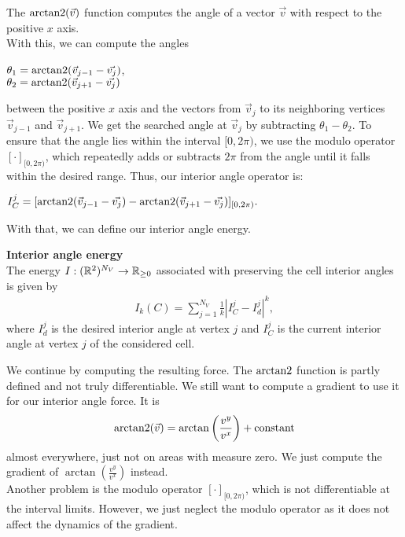 The $\operatorname{arctan2}(\vec{v})$ function computes the angle of a vector $\vec{v}$ with respect to the positive $x$ axis. \\
With this, we can compute the angles 
\begin{center}
	
	$\theta_1 = \operatorname{arctan2}( \vec{v}_{j-1} - \vec{v_j} )$, \\
	$\theta_2 = \operatorname{arctan2}( \vec{v}_{j+1} - \vec{v_j} )$
	
\end{center}
between the positive $x$ axis and the vectors from $\vec{v}_j$ to its neighboring vertices $\vec{v}_{j-1}$ and $\vec{v}_{j+1}$. 
We get the searched angle at $\vec{v}_j$ by subtracting $\theta_1 - \theta_2$.
To ensure that the angle lies within the interval $[0, 2\pi)$, we use the modulo operator $[ \cdot ]_{[0,2\pi)}$, which repeatedly adds or subtracts $2\pi$ from the angle until it falls within the desired range.
Thus, our interior angle operator is: 
\begin{center}
	$
	I^j_C = [\operatorname{arctan2}(\vec{v}_{j-1} - \vec{v_j}) - \operatorname{arctan2}(\vec{v}_{j+1} - \vec{v_j})]_{[0,2\pi)}.
	$
\end{center}

With that, we can define our interior angle energy. 
\begin{definition} \textbf{Interior angle energy} \\
	The energy $I: (\mathbb{R}^2)^{N_V} \rightarrow \mathbb{R}_{\geq 0}$ associated with preserving the cell interior angles is given by
	\begin{align}
		I_k(C) = \sum\limits_{j=1}^{N_V} \frac{1}{k}| I^j_{C} - I^{j}_d |^k, 
	\end{align}
	where $I^{j}_d$ is the desired interior angle at vertex $j$ and $I^j_{C}$ is the current interior angle at vertex $j$ of the considered cell. 
\end{definition}


We continue by computing the resulting force. 
The $\operatorname{arctan2}$ function is partly defined and not truly differentiable. 
We still want to compute a gradient to use it for our interior angle force. 
It is $$\operatorname{arctan2}(\vec{v}) = \arctan\left(\frac{v^{y}}{v^{x}} \right) + \text{constant}$$ almost everywhere, just not on areas with measure zero. 
We just compute the gradient of $\arctan(\frac{v^{y}}{v^{x}})$ instead. \\
Another problem is the modulo operator $[ \cdot ]_{[0,2\pi)}$, which is not differentiable at the interval limits.
However, we just neglect the modulo operator as it does not affect the dynamics of the gradient.

